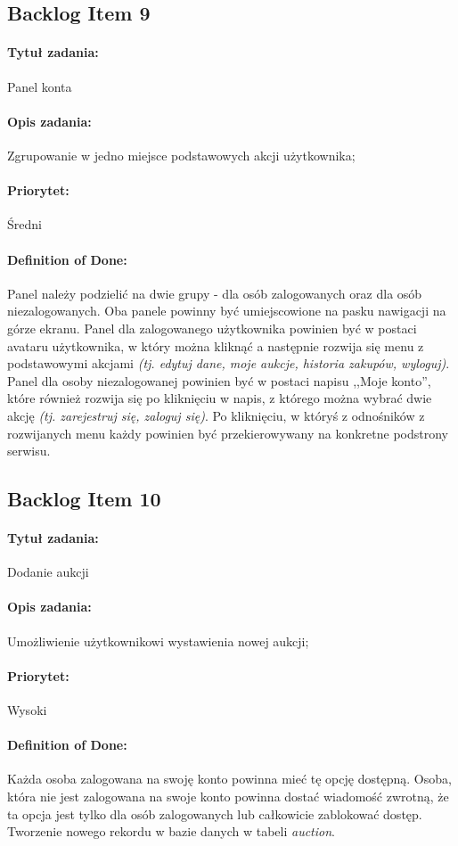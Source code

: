 \documentclass[a4paper]{article}
\begin{document}
	\subsection{Backlog Item 9}
	\paragraph{Tytuł zadania:} Panel konta
	\paragraph{Opis zadania:} Zgrupowanie w jedno miejsce podstawowych akcji użytkownika;
	\paragraph{Priorytet:} Średni
	\paragraph{Definition of Done:} Panel należy podzielić na dwie grupy - dla osób zalogowanych oraz dla osób niezalogowanych. Oba panele powinny być umiejscowione na pasku nawigacji na górze ekranu. Panel dla zalogowanego użytkownika powinien być w postaci avataru użytkownika, w który można kliknąć a następnie rozwija się menu z podstawowymi akcjami \emph{(tj. edytuj dane, moje aukcje, historia zakupów, wyloguj)}. Panel dla osoby niezalogowanej powinien być w postaci napisu ,,Moje konto'', które również rozwija się po kliknięciu w napis, z którego można wybrać dwie akcję \emph{(tj. zarejestruj się, zaloguj się)}. Po kliknięciu, w któryś z odnośników z rozwijanych menu każdy powinien być przekierowywany na konkretne podstrony serwisu.
	
	\subsection{Backlog Item 10}
	\paragraph{Tytuł zadania:} Dodanie aukcji
	\paragraph{Opis zadania:} Umożliwienie użytkownikowi wystawienia nowej aukcji;
	\paragraph{Priorytet:} Wysoki
	\paragraph{Definition of Done:} Każda osoba zalogowana na swoję konto powinna mieć tę opcję dostępną. Osoba, która nie jest zalogowana na swoje konto powinna dostać wiadomość zwrotną, że ta opcja jest tylko dla osób zalogowanych lub całkowicie zablokować dostęp. Tworzenie nowego rekordu w bazie danych w tabeli \emph{auction}.
	
\end{document}
